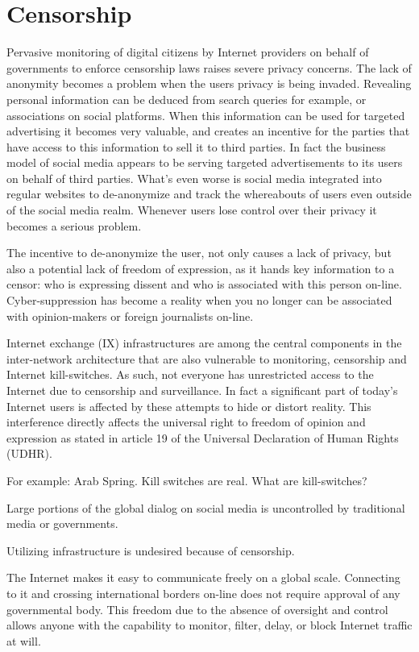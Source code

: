 \section{Censorship}
Pervasive monitoring of digital citizens by Internet providers on behalf of governments to enforce censorship laws raises severe privacy concerns.
The lack of anonymity becomes a problem when the users privacy is being invaded.
Revealing personal information can be deduced from search queries for example, or associations on social platforms.
When this information can be used for targeted advertising it becomes very valuable, and creates an incentive for the parties that have access to this information to sell it to third parties.
In fact the business model of social media appears to be serving targeted advertisements to its users on behalf of third parties.
What's even worse is social media integrated into regular websites to de-anonymize and track the whereabouts of users even outside of the social media realm.
Whenever users lose control over their privacy it becomes a serious problem.


The incentive to de-anonymize the user, not only causes a lack of privacy, but also a potential lack of freedom of expression, as it hands key information to a censor: who is expressing dissent and who is associated with this person on-line.
Cyber-suppression has become a reality when you no longer can be associated with opinion-makers or foreign journalists on-line.

Internet exchange (IX) infrastructures are among the central components in the inter-network architecture that are also vulnerable to monitoring, censorship and Internet kill-switches.
As such, not everyone has unrestricted access to the Internet due to censorship and surveillance.
In fact a significant part of today's Internet users is affected by these attempts to hide or distort reality. %
This interference directly affects the universal right to freedom of opinion and expression as stated in article 19 of the Universal Declaration of Human Rights (UDHR).


For example: Arab Spring. Kill switches are real.
What are kill-switches?


Large portions of the global dialog on social media is uncontrolled by traditional media or governments.

Utilizing infrastructure is undesired because of censorship.


The Internet makes it easy to communicate freely on a global scale.
Connecting to it and crossing international borders on-line does not require approval of any governmental body. %
This freedom due to the absence of oversight and control allows anyone with the capability to monitor, filter, delay, or block Internet traffic at will.



